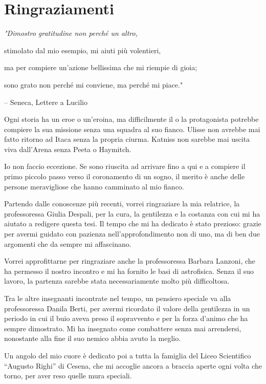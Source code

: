\chapter{Ringraziamenti}
{\raggedleft \normalsize \sl "Dimostro gratitudine non perché un altro, \par stimolato dal mio esempio,  mi aiuti più volentieri, \par ma per compiere un'azione bellissima  che mi riempie di gioia; \par sono grato non perché mi conviene, ma perché mi piace."\par 
\bigskip
\--- Seneca, Lettere a Lucilio\par
\bigskip}

\noindent Ogni storia ha un eroe o un'eroina, ma difficilmente il o la protagonista potrebbe compiere la sua missione senza una squadra al suo fianco. Ulisse non avrebbe mai fatto ritorno ad Itaca senza la propria ciurma. Katniss non sarebbe mai uscita viva dall'Arena senza Peeta o Haymitch.

Io non faccio eccezione. Se sono riuscita ad arrivare fino a qui e a compiere il primo piccolo passo verso il coronamento di un sogno, il merito è anche delle persone meravigliose che hanno camminato al mio fianco.
\medskip

Partendo dalle conoscenze più recenti, vorrei ringraziare la mia relatrice, la professoressa Giulia Despali, per la cura, la gentilezza e la costanza con cui mi ha aiutato a redigere questa tesi. Il tempo che mi ha dedicato è stato prezioso: grazie per avermi guidato con pazienza nell’approfondimento non di uno, ma di ben due argomenti che da sempre mi affascinano. 

Vorrei approfittarne per ringraziare anche la professoressa Barbara Lanzoni, che ha permesso il nostro incontro e mi ha fornito le basi di astrofisica. Senza il suo lavoro, la partenza sarebbe stata necessariamente molto più difficoltosa.

Tra le altre insegnanti incontrate nel tempo, un pensiero speciale va alla professoressa Danila Berti, per avermi ricordato il valore della gentilezza in un periodo in cui il buio aveva preso il sopravvento e per la forza d’animo che ha sempre dimostrato. Mi ha insegnato come combattere senza mai arrendersi, nonostante alla fine il suo nemico abbia avuto la meglio.  

Un angolo del mio cuore è dedicato poi a tutta la famiglia del Liceo Scientifico “Augusto Righi” di Cesena, che mi accoglie ancora a braccia aperte ogni volta che torno, per aver reso quelle mura speciali. 

